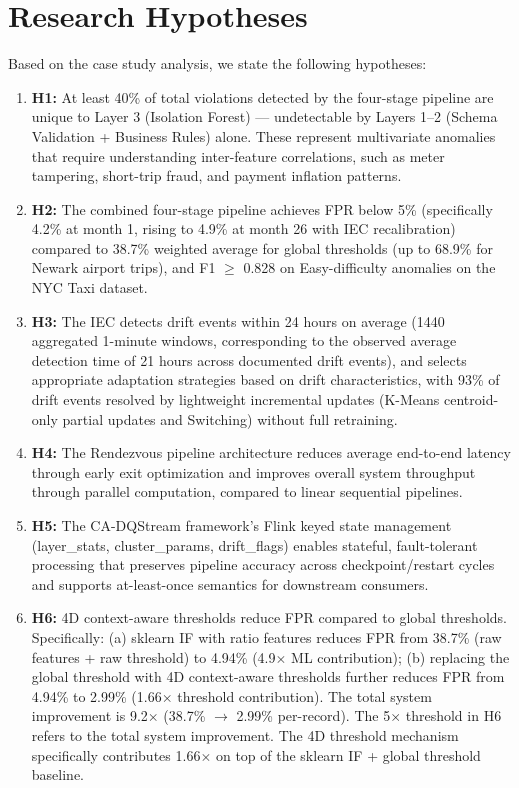 \section{Research Hypotheses}

Based on the case study analysis, we state the following hypotheses:

\begin{enumerate}
    \item \textbf{H1:} At least 40\% of total violations detected by the four-stage pipeline are unique to Layer 3 (Isolation Forest) --- undetectable by Layers 1--2 (Schema Validation + Business Rules) alone. These represent multivariate anomalies that require understanding inter-feature correlations, such as meter tampering, short-trip fraud, and payment inflation patterns.
    \item \textbf{H2:} The combined four-stage pipeline achieves FPR below 5\% (specifically 4.2\% at month 1, rising to 4.9\% at month 26 with IEC recalibration) compared to 38.7\% weighted average for global thresholds (up to 68.9\% for Newark airport trips), and F1 $\geq$ 0.828 on Easy-difficulty anomalies on the NYC Taxi dataset.
    \item \textbf{H3:} The IEC detects drift events within 24 hours on average (1440 aggregated 1-minute windows, corresponding to the observed average detection time of 21 hours across documented drift events), and selects appropriate adaptation strategies based on drift characteristics, with 93\% of drift events resolved by lightweight incremental updates (K-Means centroid-only partial updates and Switching) without full retraining.
    \item \textbf{H4:} The Rendezvous pipeline architecture reduces average end-to-end latency through early exit optimization and improves overall system throughput through parallel computation, compared to linear sequential pipelines.
    \item \textbf{H5:} The CA-DQStream framework's Flink keyed state management (layer\_stats, cluster\_params, drift\_flags) enables stateful, fault-tolerant processing that preserves pipeline accuracy across checkpoint/restart cycles and supports at-least-once semantics for downstream consumers.
    \item \textbf{H6:} 4D context-aware thresholds reduce FPR compared to global thresholds. Specifically: (a) sklearn IF with ratio features reduces FPR from 38.7\% (raw features + raw threshold) to 4.94\% (4.9$\times$ ML contribution); (b) replacing the global threshold with 4D context-aware thresholds further reduces FPR from 4.94\% to 2.99\% (1.66$\times$ threshold contribution). The total system improvement is 9.2$\times$ (38.7\% $\to$ 2.99\% per-record). The 5$\times$ threshold in H6 refers to the total system improvement. The 4D threshold mechanism specifically contributes 1.66$\times$ on top of the sklearn IF + global threshold baseline.
\end{enumerate}


